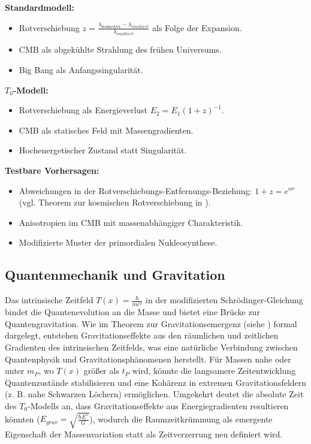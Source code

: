 \documentclass[a4paper,12pt]{article}
\newcommand{\Tfield}{T(x)}
\begin{document}
	\begin{tcolorbox}[colback=green!5!white,colframe=green!75!black,title=Neuinterpretation kosmologischer Phänomene]
		\textbf{Standardmodell:}
		\begin{itemize}
			\item Rotverschiebung \( z = \frac{\lambda_{beobachtet} - \lambda_{emittiert}}{\lambda_{emittiert}} \) als Folge der Expansion.
			\item CMB als abgekühlte Strahlung des frühen Universums.
			\item Big Bang als Anfangssingularität.
		\end{itemize}
		
		\textbf{\( T_0 \)-Modell:}
		\begin{itemize}
			\item Rotverschiebung als Energieverlust \( E_2 = E_1(1+z)^{-1} \).
			\item CMB als statisches Feld mit Massengradienten.
			\item Hochenergetischer Zustand statt Singularität.
		\end{itemize}
		
		\textbf{Testbare Vorhersagen:}
		\begin{itemize}
			\item Abweichungen in der Rotverschiebungs-Entfernungs-Beziehung: \( 1 + z = e^{\alpha r} \) (vgl. Theorem zur kosmischen Rotverschiebung in \cite{wesentlicheFormalismen}\relax).
			\item Anisotropien im CMB mit massenabhängiger Charakteristik.
			\item Modifizierte Muster der primordialen Nukleosynthese.
		\end{itemize}
	\end{tcolorbox}
	
	\subsection{Quantenmechanik und Gravitation}
	Das intrinsische Zeitfeld \(\Tfield = \frac{\hbar}{m c^2}\) in der modifizierten Schrödinger-Gleichung bindet die Quantenevolution an die Masse und bietet eine Brücke zur Quantengravitation. Wie im Theorem zur Gravitationsemergenz (siehe \cite{wesentlicheFormalismen}\relax) formal dargelegt, entstehen Gravitationseffekte aus den räumlichen und zeitlichen Gradienten des intrinsischen Zeitfelds, was eine natürliche Verbindung zwischen Quantenphysik und Gravitationsphänomenen herstellt. Für Massen nahe oder unter \( m_P \), wo \(\Tfield\) größer als \( t_P \) wird, könnte die langsamere Zeitentwicklung Quantenzustände stabilisieren und eine Kohärenz in extremen Gravitationsfeldern (z. B. nahe Schwarzen Löchern) ermöglichen. Umgekehrt deutet die absolute Zeit des \( T_0 \)-Modells an, dass Gravitationseffekte aus Energiegradienten resultieren könnten (\( E_{grav} = \sqrt{\frac{\hbar E^5}{G}} \)), wodurch die Raumzeitkrümmung als emergente Eigenschaft der Massenvariation statt als Zeitverzerrung neu definiert wird.
	
\end{document}
